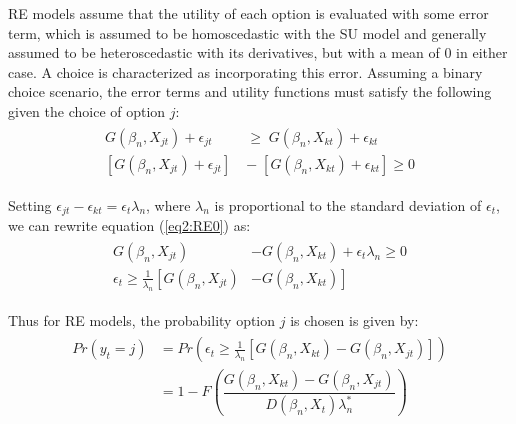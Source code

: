 \documentclass[11pt,a4paper]{report}
\newcommand\Prob{\ensuremath{\mathit{Pr}}}  %
\begin{document}
RE models assume that the utility of each option is evaluated with some error term, which is assumed to be homoscedastic with the SU model and generally assumed to be heteroscedastic with its derivatives, but with a mean of $0$ in either case.
A choice is characterized as incorporating this error.
Assuming a binary choice scenario, the error terms and utility functions must satisfy the following given the choice of option $j$:
\begin{align}
	\label{eq2:RE0}
	\begin{split}
		G(\beta_n,X_{jt}) + \epsilon_{jt} \;&\geq\; G(\beta_n,X_{kt}) + \epsilon_{kt}\\
		\left[G(\beta_n,X_{jt}) + \epsilon_{jt}\right] \;&-\; \left[G(\beta_n,X_{kt}) + \epsilon_{kt}\right] \geq 0
	\end{split}
\end{align}

\noindent Setting $\epsilon_{jt} - \epsilon_{kt} = \epsilon_t\lambda_n$, where $\lambda_n$ is proportional to the standard deviation of $\epsilon_t$,{\footnotemark} we can rewrite equation (\ref{eq2:RE0}) as:
\begin{align}
	\label{eq2:RE1}
	\begin{split}
		G(\beta_n,X_{jt}) &- G(\beta_n,X_{kt}) + \epsilon_t\lambda_n \geq 0\\
		\epsilon_t \geq \frac{1}{\lambda_n} \left[ G(\beta_n,X_{jt}) \right.  &- \left. G(\beta_n,X_{kt}) \right]
	\end{split}
\end{align}

\addtocounter{footnote}{-1}

\noindent Thus for RE models, the probability option $j$ is chosen is given by:
\begin{align}
	\label{eq2:RE.2}
	\begin{split}
	{\Prob}(y_t = j) &= {\Prob}\left(  \epsilon_t \geq \frac{1}{\lambda_n} \left[ G(\beta_n,X_{kt}) - G(\beta_n,X_{jt}) \right] \right)\\
	&= 1 - F\left( \dfrac{G(\beta_n,X_{kt}) - G(\beta_n,X_{jt})}{D(\beta_n,X_t)\lambda_n^* }  \right)
	\end{split}
\end{align}
\end{document}
